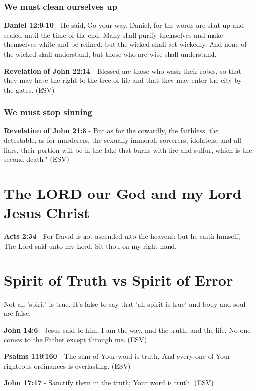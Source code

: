 \documentclass[11pt]{article}
\begin{document}
\subsubsection{We must clean ourselves up}
\label{sec:org434bdf0}
\textbf{Daniel 12:9-10} - He said, Go your way, Daniel, for the words are shut up and sealed until the time of the end.  Many shall purify themselves and make themselves white and be refined, but the wicked shall act wickedly. And none of the wicked shall understand, but those who are wise shall understand.

\textbf{Revelation of John 22:14} - Blessed are those who wash their robes, so that they may have the right to the tree of life and that they may enter the city by the gates. (ESV)

\subsubsection{We must stop sinning}
\label{sec:orge58a228}

\textbf{Revelation of John 21:8} - But as for the cowardly, the faithless, the detestable, as for murderers, the sexually immoral, sorcerers, idolaters, and all liars, their portion will be in the lake that burns with fire and sulfur, which is the second death." (ESV)

\section{The LORD our God and my Lord Jesus Christ}
\label{sec:org18d5631}
\textbf{Acts 2:34} - For David is not ascended into the heavens: but he saith himself, The Lord said unto my Lord, Sit thou on my right hand,

\section{Spirit of Truth vs Spirit of Error}
\label{sec:orgdbf5e93}
Not all 'spirit' is true.
It's false to say that 'all spirit is true' and body and soul are false.

\textbf{John 14:6} - Jesus said to him, I am the way, and the truth, and the life. No one comes to the Father except through me. (ESV)

\textbf{Psalms 119:160} - The sum of Your word is truth, And every one of Your righteous ordinances is everlasting. (ESV)

\textbf{John 17:17} - Sanctify them in the truth; Your word is truth. (ESV)
\end{document}
